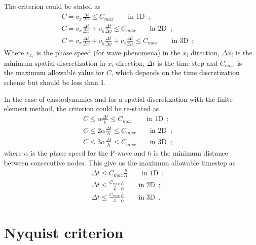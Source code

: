 \documentclass[12pt,letterpaper,landscape]{article}
\begin{document}
The criterion could be stated as 
\begin{align*}
C=v_{x}\frac{\Delta t}{\Delta x}\leq C_{max}\qquad\mbox{in 1D}\enspace;\\
C=v_{x}\frac{\Delta t}{\Delta x}+v_{y}\frac{\Delta t}{\Delta y}\leq C_{max}\qquad\mbox{in 2D}\enspace;\\
C=v_{x}\frac{\Delta t}{\Delta x}+v_{y}\frac{\Delta t}{\Delta y}+v_{z}\frac{\Delta t}{\Delta z}\leq C_{max}\qquad\mbox{in 3D}\enspace;
\end{align*}
 Where $v_{x_{i}}$ is the phase speed (for wave phenomena) in the
$x_{i}$ direction, $\Delta x_{i}$ is the minimum spatial discretization
in $x_{i}$ direction, $\Delta t$ is the time step and $C_{max}$
is the maximum allowable value for $C$, which depends on the time
discretization scheme but should be less than 1.

In the case of elastodynamics and for a spatial discretization with
the finite element method, the criterion could be re-stated as 
\begin{align*}
C\leq\alpha\frac{\Delta t}{h}\leq C_{max}\qquad\mbox{in 1D}\enspace;\\
C\leq2\alpha\frac{\Delta t}{h}\leq C_{max}\qquad\mbox{in 2D}\enspace;\\
C\leq3\alpha\frac{\Delta t}{h}\leq C_{max}\qquad\mbox{in 3D}\enspace;
\end{align*}
 where $\alpha$ is the phase speed for the P-wave and $h$ is the
minimum distance between consecutive nodes. This give us the maximum
allowable timestep as 
\begin{align}
\Delta t\leq C_{max}\frac{h}{\alpha}\qquad\mbox{in 1D}\enspace;\\
\Delta t\leq\frac{C_{max}}{2}\frac{h}{\alpha}\qquad\mbox{in 2D}\enspace;\\
\Delta t\leq\frac{C_{max}}{3}\frac{h}{\alpha}\qquad\mbox{in 3D}\enspace.
\end{align}



\section{Nyquist criterion}
\end{document}

